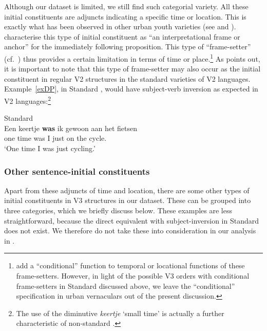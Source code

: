 \documentclass[output=paper]{langsci/langscibook}
\begin{document}
Although our dataset is limited, we still find such categorial variety. All
these initial constituents are adjuncts indicating a specific time or location.
This is exactly what has been observed in other  urban youth varieties
(see \citealt[84]{Freywaldetal:2015} and \citealt{Walkden:2017}).
\citet{Freywaldetal:2015} characterise this type of initial constituent as
\enquote{an interpretational frame or anchor} for the immediately following
proposition.  This type of \enquote{frame-setter} (cf.\ \citealt{Chafe:1976})
thus provides a certain limitation in terms of time or
place.\footnote{\textcite{Freywaldetal:2015} add a \enquote{conditional}
    function to temporal or locational functions of these frame-setters.
    However, in light of the possible V3 orders with
    conditional frame-setters in Standard  discussed above, we leave
    the \enquote{conditional} specification in  urban vernaculars
out of the present discussion.} As \textcite{Walkden:2017} points out, it is
important to note that this type of frame-setter may also occur as the initial
constituent in regular V2 structures in the standard
varieties of  V2 languages.
Example~\eqref{exDP}, in Standard , would have subject-verb inversion
as expected in V2 languages:\footnote{The use of the
diminutive \emph{keertje} `small time' is actually a further characteristic of
non-standard .}

\begin{exe}                   %
\ex Standard \\
\gll\label{exDP}Een keertje \textbf{was} ik gewoon aan het fietsen\\
one time was I just on the cycle.\Inf{}\\
\trans \enquote*{One time I was just cycling.}
\end{exe}                   %

\subsubsection{Other sentence-initial constituents}

\noindent Apart from these adjuncts of time and location, there are some other
types of initial constituents in V3 structures in our dataset. These can be
grouped into three categories, which we briefly discuss below. These examples
are less straightforward, because the direct equivalent with subject-inversion
in Standard  does not exist. We therefore do not take these into
consideration in our analysis in .
\end{document}
